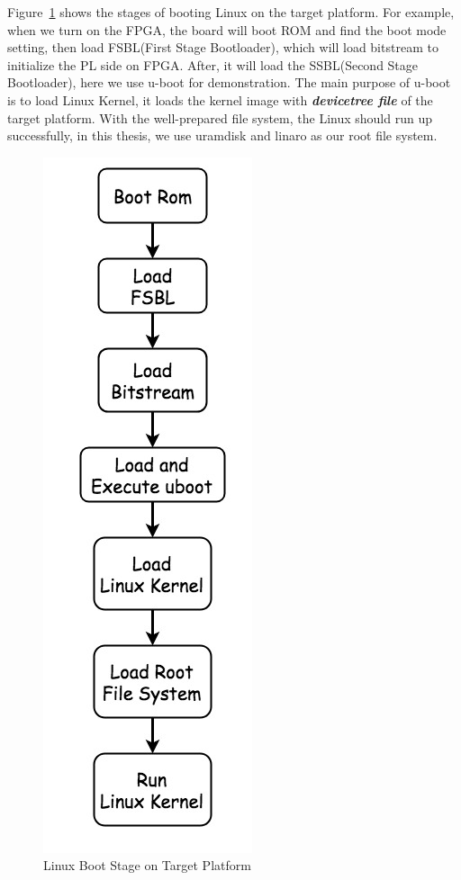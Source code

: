 Figure~\ref{fig:Linux Boot Stage on Target Platform} shows the stages of booting Linux on the target platform. For example, when we turn on the FPGA, the board will boot ROM and find the boot mode setting, then load FSBL(First Stage Bootloader), which will load bitstream to initialize the PL side on FPGA. After, it will load the SSBL(Second Stage Bootloader), here we use u-boot for demonstration. The main purpose of u-boot is to load Linux Kernel, it loads the kernel image with \textbf{\emph{devicetree file}} of the target platform. With the well-prepared file system, the Linux should run up successfully, in this thesis, we use uramdisk and linaro\cite{linaro} as our root file system.
\begin{figure}[!htb]
  \centering
  \includegraphics[scale=0.4]{images/linux_boot_stage.jpg}
  \caption[Linux Boot Stage on Target Platform]{Linux Boot Stage on Target Platform}
  \label{fig:Linux Boot Stage on Target Platform}
\end{figure}



